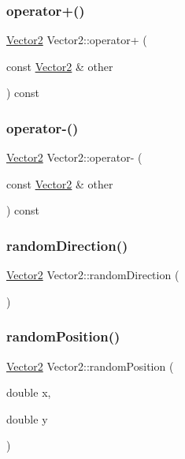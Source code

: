 \subsubsection{\texorpdfstring{operator+()}{operator+()}}
{\footnotesize\ttfamily \mbox{\hyperlink{struct_vector2}{Vector2}} Vector2\+::operator+ (\begin{DoxyParamCaption}\item[{const \mbox{\hyperlink{struct_vector2}{Vector2}} \&}]{other }\end{DoxyParamCaption}) const}

\mbox{\label{struct_vector2_a9f6650ee1529209532c14fc0e4e97a6a}} 
\subsubsection{\texorpdfstring{operator-\/()}{operator-()}}
{\footnotesize\ttfamily \mbox{\hyperlink{struct_vector2}{Vector2}} Vector2\+::operator-\/ (\begin{DoxyParamCaption}\item[{const \mbox{\hyperlink{struct_vector2}{Vector2}} \&}]{other }\end{DoxyParamCaption}) const}

\mbox{\label{struct_vector2_a4ae4f36c515bda9939cfe36e58b25f45}} 
\subsubsection{\texorpdfstring{random\+Direction()}{randomDirection()}}
{\footnotesize\ttfamily \mbox{\hyperlink{struct_vector2}{Vector2}} Vector2\+::random\+Direction (\begin{DoxyParamCaption}{ }\end{DoxyParamCaption})\hspace{0.3cm}{\ttfamily [static]}}

\mbox{\label{struct_vector2_a13b12c4d8b92bbc3de6fca42cb7a2749}} 
\subsubsection{\texorpdfstring{random\+Position()}{randomPosition()}}
{\footnotesize\ttfamily \mbox{\hyperlink{struct_vector2}{Vector2}} Vector2\+::random\+Position (\begin{DoxyParamCaption}\item[{double}]{x,  }\item[{double}]{y }\end{DoxyParamCaption})\hspace{0.3cm}{\ttfamily [static]}}

